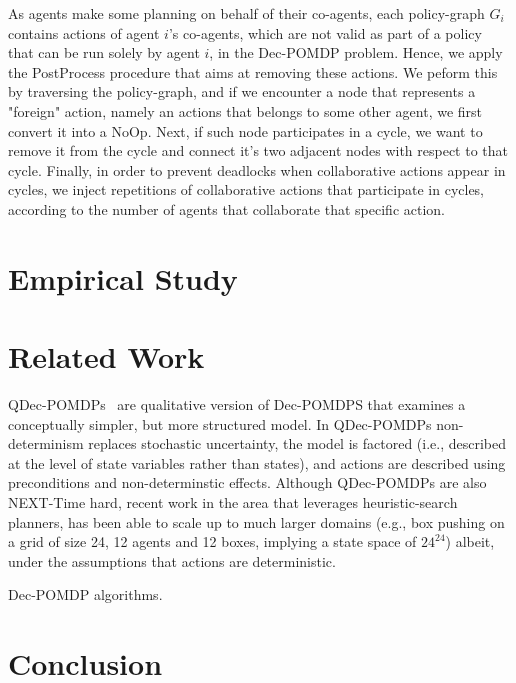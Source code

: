 \documentclass[letterpaper]{article} %
\begin{document}
As agents make some planning on behalf of their co-agents, each policy-graph $G_i$ contains actions of agent $i$'s co-agents, which are not valid as part of a policy that can be run solely by agent $i$, in the Dec-POMDP problem. Hence, we apply the PostProcess procedure that aims at removing these actions. We peform this by traversing the policy-graph, and if we encounter a node that represents a "foreign" action, namely an actions that belongs to some other agent, we first convert it into a NoOp. Next, if such node participates in a cycle, we want to remove it from the cycle and connect it's two adjacent nodes with respect to that cycle. 
Finally, in order to prevent deadlocks when collaborative actions appear in cycles, we inject repetitions of collaborative actions that participate in cycles, according to the number of agents that collaborate that specific action.


\section{Empirical Study}

\section{Related Work}
QDec-POMDPs~\cite{} are qualitative version of Dec-POMDPS that examines a conceptually simpler, but more structured model. In QDec-POMDPs 
non-determinism replaces stochastic uncertainty, the model is factored (i.e., described at the level of state variables rather than states), and actions 
are described using preconditions and non-determinstic effects. Although QDec-POMDPs are also NEXT-Time hard, recent work in the area that
leverages heuristic-search planners, has been able to scale up to much larger domains (e.g., box pushing on a grid of size 24,  12 agents and 12 boxes, implying a state space of $24^24$)
albeit, under the assumptions that actions are deterministic.

Dec-POMDP algorithms.

\section{Conclusion}



\end{document}
